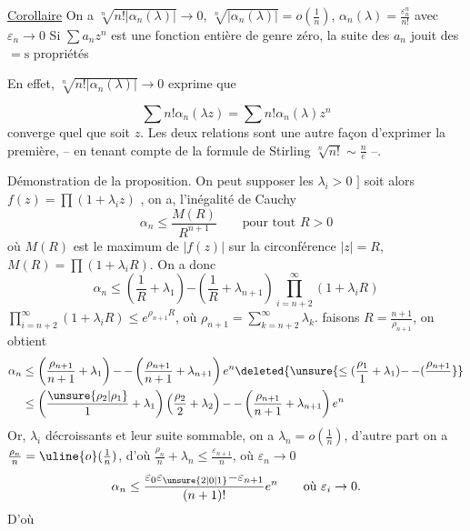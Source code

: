 \uline{Corollaire} On a  $\sqrt[n]{n!|\alpha_n(\lambda)|}\to 0$,
$\sqrt[n]{|\alpha_n(\lambda)|}=o\left(\frac{1}{n}\right)$, $\alpha_n(\lambda)=\frac{\varepsilon_n^n}{n!}$ avec $\varepsilon_n\to 0$
Si $\sum a_nz^n$ est une fonction entière de
genre zéro, la suite des $a_n$ jouit
des $=\mathrm s$ propriétés

En effet, $\sqrt[n]{n!|\alpha_n(\lambda)|}\to 0$ exprime que


\[ \sum n!\alpha_n(\lambda z)=\sum n!\alpha_n(\lambda)z^n \]
converge
quel que soit $z$. Les deux  relations
 sont une autre façon d'exprimer la première,
-- en tenant compte de la formule de
Stirling $\sqrt[n]{n!}\sim\frac{n}{e}$ --.

Démonstration de la proposition. On peut
supposer les $\lambda_i>0$  $]$ soit alors $f(z)=\prod(1+\lambda_i z)$
,   on a,  l'inégalité
de Cauchy
\[ \alpha_n\leq\frac{M(R)}{R^{n+1}}\qquad\text{pour tout }R>0 \]
où $M(R)$ est le maximum de $|f(z)|$ sur la
circonférence $|z|=R$,  $M(R)=\prod(1+\lambda_iR)$.
 On a donc
\[ \alpha_n\leq\left(\frac1R+\lambda_1\right)\mathord{-}\left(\frac1R+\lambda_{n+1}\right)\prod_{i=n+2}^{\infty}(1+\lambda_i R) \]
  $\prod_{i=n+2}^{\infty}(1+\lambda_i R)\leq e^{\rho_{n+1}R}$, où
$\rho_{n+1}=\sum_{k=n+2}^{\infty}\lambda_k$. faisons $R=\frac{n+1}{\rho_{n+1}}$, on obtient
\[ \begin{aligned}
\alpha_n&\leq\left(\frac{\rho_{n+1}}{n+1}+\lambda_1\right)\mathord{-}\,\mathord{-}\left(\frac{\rho_{n+1}}{n+1}+\lambda_{n+1}\right)e^n \deleted{\unsure{\leq(\frac{\rho_1}{1}+\lambda_1)\mathord{-}\,\mathord{-}(\frac{\rho_{n+1}}{}}}\\
&\leq\left(\frac{\unsure{\rho_2|\rho_1}}{1}+\lambda_1\right)\left(\frac{\rho_2}{2}+\lambda_2\right)\mathord{-}\,\mathord{-}\left(\frac{\rho_{n+1}}{n+1}+\lambda_{n+1}\right)e^n
\end{aligned} \]
Or,   $\lambda_i$   décroissants et leur
suite sommable, on a $\lambda_n=o(\frac1n)$, d'autre part on
a  $\frac{\rho_n}{n}=\uline{o}(\frac{1}{n})$, d'où $\frac{\rho_n}{n}+\lambda_n\leq\frac{\varepsilon_{n+1}}{n}$, où $\varepsilon_n\to0$
\[ \alpha_n\leq\frac{\varepsilon_0\varepsilon_{\unsure{2|0|1}}\mathord{-}\varepsilon_{n+1}}{(n+1)!}e^n\qquad\text{où }\varepsilon_i\to0. \]
D'où


